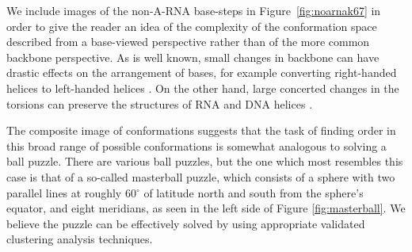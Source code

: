 We    include    images     of    the    non-A-RNA    base-steps    in
Figure~\ref{fig:noarnak67} in order to give  the reader an idea of the
complexity  of the  conformation  space described  from a  base-viewed
perspective rather  than of the more common  backbone perspective.  As
is well known,  small changes in backbone can  have drastic effects on
the arrangement of bases,  for example converting right-handed helices
to  left-handed helices  \cite{olson1976}.  On  the other  hand, large
concerted changes in  the torsions can preserve the  structures of RNA
and DNA helices \cite{olson1981}.

The composite image of conformations suggests that the task of finding
order  in  this broad  range  of  possible  conformations is  somewhat
analogous to solving  a ball puzzle.  There are  various ball puzzles,
but the  one which  most resembles  this case is  that of  a so-called
masterball puzzle, which consists of  a sphere with two parallel lines
at roughly 60$^{\circ}$ of latitude  north and south from the sphere's
equator,  and eight  meridians, as  seen in  the left  side  of Figure
\ref{fig:masterball}. We believe the  puzzle can be effectively solved
by using appropriate validated clustering analysis techniques.


